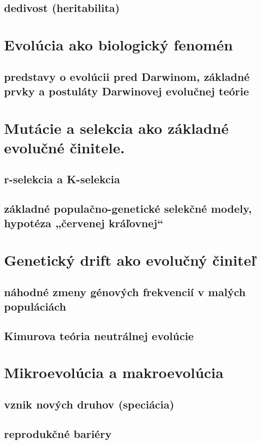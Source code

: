 \subsection*{dedivost (heritabilita)}

\section{Evolúcia ako biologický fenomén}
\subsection*{predstavy o evolúcii pred Darwinom, základné prvky a postuláty Darwinovej evolučnej teórie}

\section{Mutácie a selekcia ako základné evolučné činitele.}
\subsection*{r-selekcia a K-selekcia}
\subsection*{základné populačno-genetické selekčné modely, hypotéza „červenej kráľovnej“}

\section{Genetický drift ako evolučný činiteľ}
\subsection*{náhodné zmeny génových frekvencií v malých populáciách}
\subsection*{Kimurova teória neutrálnej evolúcie}

\section{Mikroevolúcia a makroevolúcia}
\subsection*{vznik nových druhov (speciácia)}
\subsection*{reprodukčné bariéry}
